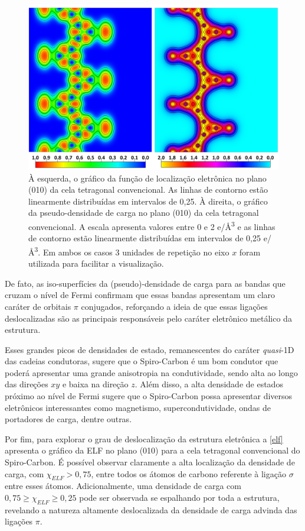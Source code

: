 	\begin{figure}[!ht]
		\centering
		\includegraphics[width=1\linewidth]{capitulos/fig/ELF}
		\caption{À esquerda, o gráfico da função de localização eletrônica no plano (010) da cela tetragonal convencional. As linhas de contorno estão linearmente distribuídas em intervalos de 0,25. À direita, o gráfico da pseudo-densidade de carga no plano (010) da cela tetragonal convencional. A escala apresenta valores entre 0 e 2 e/Å\textsuperscript{3} e as linhas de contorno estão linearmente distribuídas em intervalos de 0,25 e/Å\textsuperscript{3}. Em ambos os casos 3 unidades de repetição no eixo $x$ foram utilizada para facilitar a visualização.}
		\label{elf}
	\end{figure}

	De fato, as iso-superfícies da (pseudo)-densidade de carga para as bandas que cruzam o nível de Fermi confirmam que essas bandas apresentam um claro caráter de orbitais $\pi$ conjugados, reforçando a ideia de que essas ligações deslocalizadas são as principais responsáveis pelo caráter eletrônico metálico da estrutura.  
	
	Esses grandes picos de densidades de estado, remanescentes do caráter \textit{quasi}-1D das cadeias condutoras, sugere que o Spiro-Carbon é um bom condutor que poderá apresentar uma grande anisotropia na condutividade, sendo alta ao longo das direções $xy$ e baixa na direção $z$. Além disso, a alta densidade de estados próximo ao nível de Fermi sugere que o Spiro-Carbon possa apresentar diversos eletrônicos interessantes como magnetismo, supercondutividade, ondas de portadores de carga, dentre outras.

	Por fim, para explorar o grau de deslocalização da estrutura eletrônica a \autoref{elf} apresenta o gráfico da ELF no plano (010) para a cela tetragonal convencional do Spiro-Carbon. É possível observar claramente a alta localização da densidade de carga, com  $\chi_{ELF}>0,75$, entre todos os átomos de carbono referente à ligação $\sigma$ entre esses átomos. Adicionalmente, uma densidade de carga com $0,75\geq \chi_{ELF}\geq 0,25$ pode ser observada se espalhando por toda a estrutura, revelando a natureza altamente deslocalizada da densidade de carga advinda das ligações $\pi$. 
	
